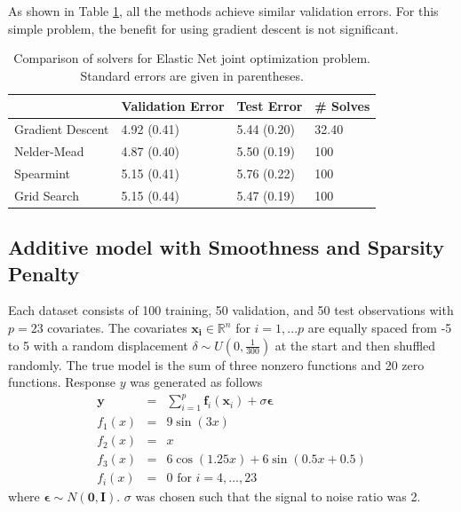\documentclass[12pt]{article}
\begin{document}
As shown in Table \ref{tab:elasticnet}, all the methods achieve similar validation errors. For this simple problem, the benefit for using gradient descent is not significant.

\begin{table}
\caption {\label{tab:elasticnet} Comparison of solvers for Elastic Net joint optimization problem. Standard errors are given in parentheses.}
\centering
\begin{tabular}{| l | l | l | l | }
\hline
& Validation Error  & Test Error & \# Solves\\
\hline
Gradient Descent & 4.92 (0.41) & 5.44 (0.20) & 32.40 \\
\hline
Nelder-Mead & 4.87 (0.40) & 5.50 (0.19) & 100 \\
\hline
Spearmint & 5.15 (0.41) & 5.76 (0.22) & 100 \\
\hline
Grid Search & 5.15 (0.44) & 5.47 (0.19) & 100 \\
\hline
\end{tabular}
\end{table}


\subsection{Additive model with Smoothness and Sparsity Penalty}
\label{sec:simulation_sparse_add}
Each dataset consists of 100 training, 50 validation, and 50 test observations with $p=23$ covariates. The covariates $\boldsymbol{x_i} \in \mathbb{R}^{n}$ for $i=1,...p$ are equally spaced from -5 to 5 with a random displacement $ \delta \sim U(0, \frac{1}{300}) $ at the start and then shuffled randomly. The true model is the sum of three nonzero functions and 20 zero functions. Response $y$ was generated as follows
\begin{eqnarray*}
\boldsymbol y &=& \sum\limits_{i=1}^p \boldsymbol f_i(\boldsymbol x_i) + \sigma \boldsymbol \epsilon\\
f_1(x) &=& 9 \sin(3x)\\
f_2(x) &=& x\\
f_3(x) &=& 6 \cos(1.25 x) + 6 \sin(0.5 x + 0.5)\\
f_i(x) &=& 0 \text{ for }   i=4,...,23
\label{eq:simulation_sparse_add}
\end{eqnarray*}
where $\boldsymbol \epsilon \sim N(\boldsymbol 0, \boldsymbol I)$. $\sigma$ was chosen such that the signal to noise ratio was 2.
\end{document}
